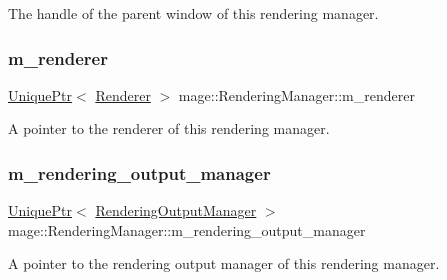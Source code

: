 The handle of the parent window of this rendering manager. \hypertarget{classmage_1_1_rendering_manager_ade28531cb0299efcf297b09e9f35bd79}{}\label{classmage_1_1_rendering_manager_ade28531cb0299efcf297b09e9f35bd79} 
\subsubsection{\texorpdfstring{m\+\_\+renderer}{m\_renderer}}
{\footnotesize\ttfamily \hyperlink{namespacemage_a3316d7143a973e37adf1110f2e80ca31}{Unique\+Ptr}$<$ \hyperlink{classmage_1_1_renderer}{Renderer} $>$ mage\+::\+Rendering\+Manager\+::m\+\_\+renderer\hspace{0.3cm}{\ttfamily [private]}}

A pointer to the renderer of this rendering manager. \hypertarget{classmage_1_1_rendering_manager_a305697e04c779ea637c1e11ae9065a69}{}\label{classmage_1_1_rendering_manager_a305697e04c779ea637c1e11ae9065a69} 
\subsubsection{\texorpdfstring{m\+\_\+rendering\+\_\+output\+\_\+manager}{m\_rendering\_output\_manager}}
{\footnotesize\ttfamily \hyperlink{namespacemage_a3316d7143a973e37adf1110f2e80ca31}{Unique\+Ptr}$<$ \hyperlink{classmage_1_1_rendering_output_manager}{Rendering\+Output\+Manager} $>$ mage\+::\+Rendering\+Manager\+::m\+\_\+rendering\+\_\+output\+\_\+manager\hspace{0.3cm}{\ttfamily [private]}}

A pointer to the rendering output manager of this rendering manager. \hypertarget{classmage_1_1_rendering_manager_aa31eab8068bf43e3b90f72644495c16a}{}\label{classmage_1_1_rendering_manager_aa31eab8068bf43e3b90f72644495c16a} 

